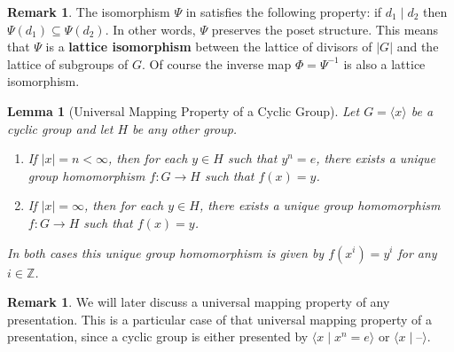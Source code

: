 \documentclass[12pt]{report}
\newtheorem{lemma}[theorem]{Lemma}
\numberwithin{equation}{section}
\numberwithin{theorem}{chapter}
\theoremstyle{definition}
\newtheorem*{basic properties}{Basic Properties}
\newtheorem*{Important Remark}{Important Remark}
\newtheorem{remark}[theorem]{Remark}
\newcommand{\df}[1]{{\bf #1}\index{#1}}
\begin{document}
\begin{remark}
The isomorphism $\Psi$ in  satisfies the following property: if $d_1\mid d_2$ then $\Psi(d_1)\subseteq \Psi(d_2)$. In other words, $\Psi$ preserves the poset structure. This means that $\Psi$ is a \df{lattice isomorphism} between the lattice of divisors of $|G|$ and the lattice of subgroups of $G$. Of course the inverse map $\Phi =\Psi^{-1}$ is also a lattice isomorphism.
\end{remark}

\begin{lemma}[Universal Mapping Property of a Cyclic Group]\label{UMP for cyclic groups}
Let $G = \langle x \rangle$ be a cyclic group and let $H$ be any other group. 

\begin{enumerate}
	\item If $|x| = n < \infty$, then for each $y \in H$ such that $y^n = e$, 
there exists a unique group homomorphism $f\!: G \to H$ such that $f(x) = y$. 

\item If $|x| = \infty$, then for each $y \in H$,  there exists a unique group homomorphism $f\!: G \to H$ such that $f(x) = y$. 
\end{enumerate}
In both cases this unique group homomorphism is given by $f(x^i)=y^i$ for any $i \in \mathbb{Z}$.
\end{lemma}

\begin{remark} 
We will later discuss a universal mapping property of any presentation.
This is a particular case of that universal mapping property of a presentation, since a cyclic group is either presented by $\langle x \mid x^n = e \rangle$ or $\langle x \mid \textrm{--} \rangle$.
\end{remark}
\end{document}
